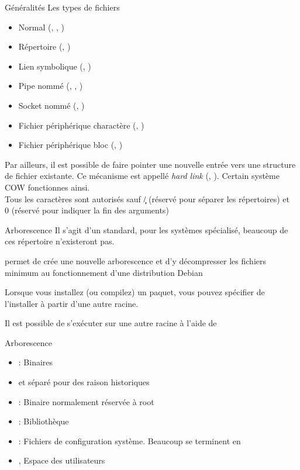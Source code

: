 \begin{frame}[fragile=singleslide]{Généralités}
  Les types de fichiers
  \begin{itemize}
  \item Normal (, , )
  \item Répertoire (, )
  \item Lien symbolique (, )
  \item Pipe nommé (, , )
  \item Socket nommé (, )
  \item     Fichier    périphérique     charactère    (,
    )
  \item Fichier périphérique bloc (, )
  \end{itemize}

  Par ailleurs, il  est possible de faire pointer  une nouvelle entrée
  vers une  structure de fichier existante.  Ce  mécanisme est appellé
  \emph{hard link}  (, ). Certain  système COW
  fonctionnes ainsi.
  \\
  Tous les caractères sont  autorisés sauf \c{/} (réservé pour séparer
  les  répertoires)  et \c{\\0}  (réservé  pour  indiquer  la fin  des
  arguments)
\end{frame}

\begin{frame}[fragile=singleslide]{Arborescence}
  Il s'agit  d'un standard, pour les systèmes  spécialisé, beaucoup de
  ces répertoire n'existeront pas.

   permet de crée une nouvelle arborescence et d'y
  décompresser   les   fichiers   minimum  au   fonctionnement   d'une
  distribution Debian

  Lorsque  vous  installez  (ou   compilez)  un  paquet,  vous  pouvez
  spécifier de l'installer à partir d'une autre racine.

  Il  est possible  de s'exécuter  sur une  autre racine  à  l'aide de
\end{frame}

\begin{frame}[fragile=singleslide]{Arborescence}
  \begin{itemize}
  \item  {}      :
    Binaires
  \item \file{/} et  séparé pour des raison historiques
  \item {}: Binaire normalement réservée à root
  \item {} : Bibliothèque
  \item {}:  Fichiers de configuration  système.  Beaucoup se
    terminent en 
  \item {},  Espace des utilisateurs
  \end{itemize}
\end{frame}

